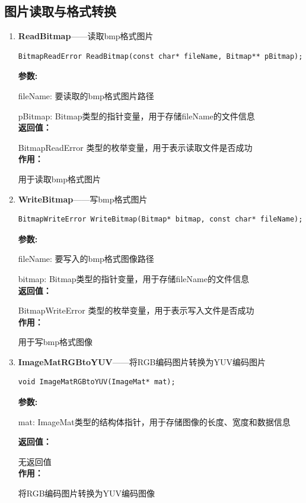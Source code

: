 \documentclass[12pt, a4paper, oneside]{ctexbook}
\begin{document}
		\subsection{图片读取与格式转换}
		\begin{enumerate}
			\item \textbf{ReadBitmap}——读取bmp格式图片
				\begin{lstlisting}[numbers=none]
BitmapReadError ReadBitmap(const char* fileName, Bitmap** pBitmap);
				\end{lstlisting}
				\textbf{参数:} \par fileName: 要读取的bmp格式图片路径 \par pBitmap: Bitmap类型的指针变量，用于存储fileName的文件信息 \\
				\textbf{返回值：}\par BitmapReadError 类型的枚举变量，用于表示读取文件是否成功\\
				\textbf{作用：}\par 用于读取bmp格式图片\\
			
			\item \textbf{WriteBitmap}——写bmp格式图片
				\begin{lstlisting}[numbers=none]
BitmapWriteError WriteBitmap(Bitmap* bitmap, const char* fileName);
				\end{lstlisting}
				\textbf{参数:} \par fileName: 要写入的bmp格式图像路径 \par bitmap: Bitmap类型的指针变量，用于存储fileName的文件信息 \\
				\textbf{返回值：}\par BitmapWriteError 类型的枚举变量，用于表示写入文件是否成功\\
				\textbf{作用：}\par 用于写bmp格式图像\\
			
			\item \textbf{ImageMatRGBtoYUV}——将RGB编码图片转换为YUV编码图片
				\begin{lstlisting}[numbers=none]
void ImageMatRGBtoYUV(ImageMat* mat);
				\end{lstlisting}
				\textbf{参数:} \par mat: ImageMat类型的结构体指针，用于存储图像的长度、宽度和数据信息\par 
				\textbf{返回值：}\par 无返回值 \\
				\textbf{作用：}\par  将RGB编码图片转换为YUV编码图像\\


\end{enumerate}
\end{document}
